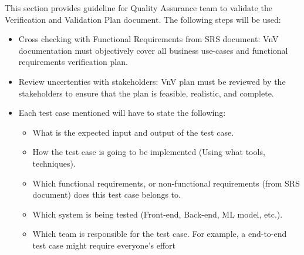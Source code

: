 \documentclass[12pt, titlepage]{article}
\begin{document}
This section provides guideline for Quality Assurance team to validate the Verification and Validation Plan document. The following steps will be used:
\begin{itemize}
  \item{Cross checking with Functional Requirements from SRS document: VnV documentation must objectively cover all business use-cases and functional requirements verification plan.}
  \item{Review uncertenties with stakeholders: VnV plan must be reviewed by the stakeholders to ensure that the plan is feasible, realistic, and complete.}
  \item{Each test case mentioned will have to state the following:}
  \begin{itemize}
    \item{What is the expected input and output of the test case.}
    \item{How the test case is going to be implemented (Using what tools, techniques).}
    \item{Which functional requirements, or non-functional requirements (from SRS document) does this test case belongs to.}
    \item{Which system is being tested (Front-end, Back-end, ML model, etc.).}
    \item{Which team is responsible for the test case. For example, a end-to-end test case might require everyone's effort}
  \end{itemize}
\end{itemize}
\end{document}
